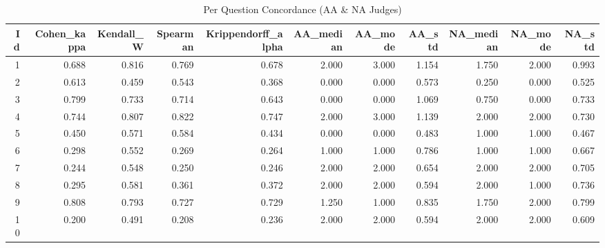 \begin{table}
\caption{Per Question Concordance (AA & NA Judges)}
\label{tab:per_question_concordance_AA_NA_judges}
\begin{tabular}{rrrrrrrrrrr}
\toprule
Id & Cohen_kappa & Kendall_W & Spearman & Krippendorff_alpha & AA_median & AA_mode & AA_std & NA_median & NA_mode & NA_std \\
\midrule
1 & 0.688 & 0.816 & 0.769 & 0.678 & 2.000 & 3.000 & 1.154 & 1.750 & 2.000 & 0.993 \\
2 & 0.613 & 0.459 & 0.543 & 0.368 & 0.000 & 0.000 & 0.573 & 0.250 & 0.000 & 0.525 \\
3 & 0.799 & 0.733 & 0.714 & 0.643 & 0.000 & 0.000 & 1.069 & 0.750 & 0.000 & 0.733 \\
4 & 0.744 & 0.807 & 0.822 & 0.747 & 2.000 & 3.000 & 1.139 & 2.000 & 2.000 & 0.730 \\
5 & 0.450 & 0.571 & 0.584 & 0.434 & 0.000 & 0.000 & 0.483 & 1.000 & 1.000 & 0.467 \\
6 & 0.298 & 0.552 & 0.269 & 0.264 & 1.000 & 1.000 & 0.786 & 1.000 & 1.000 & 0.667 \\
7 & 0.244 & 0.548 & 0.250 & 0.246 & 2.000 & 2.000 & 0.654 & 2.000 & 2.000 & 0.705 \\
8 & 0.295 & 0.581 & 0.361 & 0.372 & 2.000 & 2.000 & 0.594 & 2.000 & 1.000 & 0.736 \\
9 & 0.808 & 0.793 & 0.727 & 0.729 & 1.250 & 1.000 & 0.835 & 1.750 & 2.000 & 0.799 \\
10 & 0.200 & 0.491 & 0.208 & 0.236 & 2.000 & 2.000 & 0.594 & 2.000 & 2.000 & 0.609 \\
\bottomrule
\end{tabular}
\end{table}
